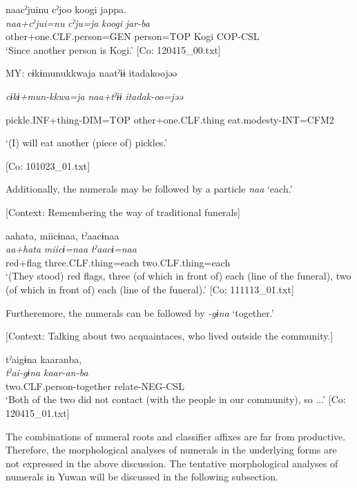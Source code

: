 \glll  naacˀjuinu  cˀjoo  koogi  jappa.\\
\textit{naa+cˀjui=nu}  \textit{cˀju=ja}  \textit{koogi}  \textit{jar-ba}\\
other+one.CLF.person=GEN  person=TOP  Kogi  COP-CSL\\
\glt ‘Since another person is Kogi.’ [Co: 120415\_00.txt]

\ex \label{ex:7:19b}MY:  cɨkɨmunukkwaja  naatˀɨɨ  {\textbar}itadak{\textbar}oojəə

      \textit{cɨkɨ+mun-kkwa=ja}  \textit{naa+tˀɨɨ}  \textit{itadak-oo=jəə}

      pickle.INF+thing-DIM=TOP  other+one.CLF.thing  eat.modesty-INT=CFM2

      ‘(I) will eat another (piece of) pickles.’

      [Co: 101023\_01.txt]
  \z
\z

  Additionally, the numerals may be followed by a particle \textit{naa} ‘each.’

\ea \label{ex:7:20}  [Context: Remembering the way of traditional funerals]

\glll  aahata,  miicɨnaa,  tˀaacɨnaa\\
\textit{aa+hata}  \textit{miicɨ=naa}  \textit{tˀaacɨ=naa}\\
red+flag  three.CLF.thing=each  two.CLF.thing=each\\
\glt ‘(They stood) red flags, three (of which in front of) each (line of the funeral), two (of which in front of) each (line of the funeral).’ [Co: 111113\_01.txt]
\z

  Furtheremore, the numerals can be followed by \textit{{}-gɨna} ‘together.’

\ea \label{ex:7:21}  [Context: Talking about two acquaintaces, who lived outside the community.]

\glll  tˀaigɨna  kaaranba,\\
\textit{tˀai-gɨna}  \textit{kaar-an-ba}\\
two.CLF.person-together  relate-NEG-CSL\\
\glt ‘Both of the two did not contact (with the people in our community), so ...’ [Co: 120415\_01.txt]
\z

The combinations of numeral roots and classifier affixes are far from productive. Therefore, the morphological analyses of numerals in the underlying forms are not expressed in the above discussion. The tentative morphological analyses of numerals in Yuwan will be discussed in the following subsection.

